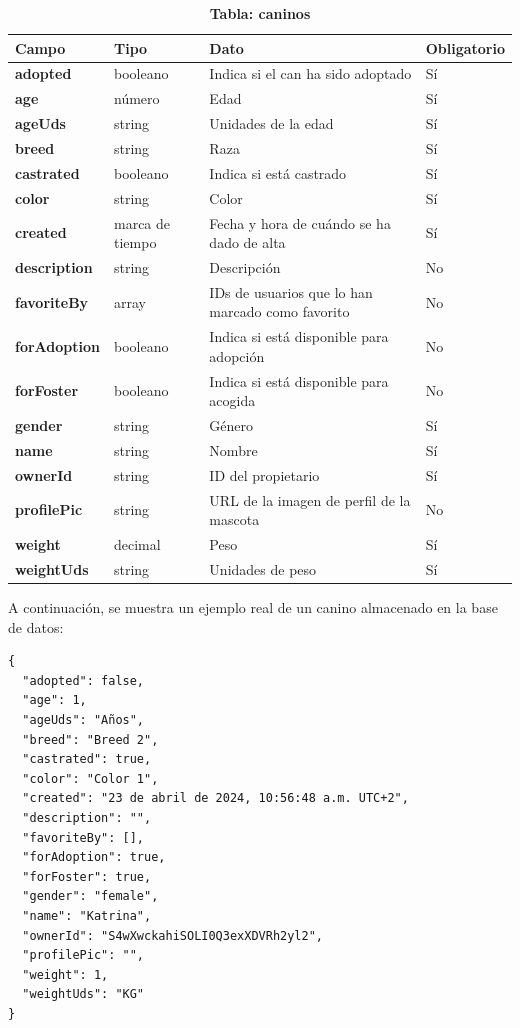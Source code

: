 \documentclass[a4paper, 12pt]{article}
\begin{document}
\begin{table}[H]
\captionsetup{justification=raggedright,singlelinecheck=false}
\captionsetup{labelformat=empty}
\caption{\textbf{Tabla: caninos}}
\label{tab:dogs}
	\begin{tabular}{|m{3cm}|m{2cm}|m{5cm}|m{3cm}|}
	\hline
	\textbf{Campo} & \textbf{Tipo} & \textbf{Dato} & \textbf{Obligatorio} \\ 
	\hline
	\textbf{adopted} & booleano & Indica si el can ha sido adoptado & Sí \\ 
	\hline
	\textbf{age} & número & Edad &  Sí \\ 
	\hline
	\textbf{ageUds} & string & Unidades de la edad & Sí \\ 
	\hline
	\textbf{breed} & string & Raza &  Sí \\ 
	\hline
	\textbf{castrated} & booleano & Indica si está castrado & Sí \\ 
	\hline
	\textbf{color} & string & Color & Sí \\ 
	\hline
	\textbf{created} & marca de tiempo & Fecha y hora de cuándo se ha dado de alta &  Sí \\ 
	\hline
	\textbf{description} & string & Descripción & No \\ 
	\hline
	\textbf{favoriteBy} & array & IDs de usuarios que lo han marcado como favorito & No \\ 
	\hline
	\textbf{forAdoption} & booleano & Indica si está disponible para adopción & No \\ 
	\hline
	\textbf{forFoster} & booleano & Indica si está disponible para acogida & No \\ 
	\hline
	\textbf{gender} & string & Género & Sí \\ 
	\hline
	\textbf{name} & string & Nombre & Sí \\ 
	\hline
	\textbf{ownerId} & string & ID del propietario &  Sí \\ 
	\hline
	\textbf{profilePic} & string & URL de la imagen de perfil de la mascota & No \\ 
	\hline
	\textbf{weight} & decimal & Peso & Sí \\ 
	\hline
	\textbf{weightUds} & string & Unidades de peso &  Sí \\ 
	\hline
\end{tabular}
\end{table}

A continuación, se muestra un ejemplo real de un canino almacenado en la base de datos:

\begin{verbatim}
{
  "adopted": false,
  "age": 1,
  "ageUds": "Años",
  "breed": "Breed 2",
  "castrated": true,
  "color": "Color 1",
  "created": "23 de abril de 2024, 10:56:48 a.m. UTC+2",
  "description": "",
  "favoriteBy": [],
  "forAdoption": true,
  "forFoster": true,
  "gender": "female",
  "name": "Katrina",
  "ownerId": "S4wXwckahiSOLI0Q3exXDVRh2yl2",
  "profilePic": "",
  "weight": 1,
  "weightUds": "KG"
}
\end{verbatim}
\end{document}
